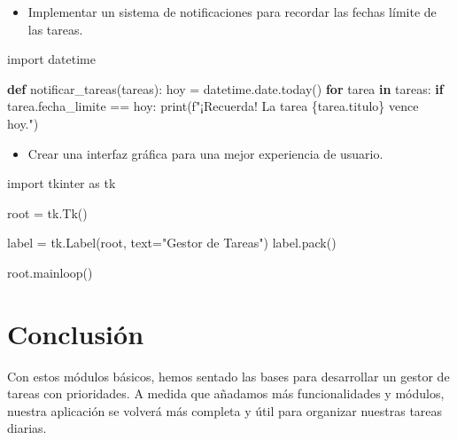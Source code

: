 \documentclass[
  a4paper,
  DIV=11,
  numbers=noendperiod,
  onepage,
  openany]{scrreprt}
\newenvironment{Shaded}{\begin{snugshade}}{\end{snugshade}}
\newcommand{\BuiltInTok}[1]{\textcolor[rgb]{0.00,0.23,0.31}{#1}}
\newcommand{\ControlFlowTok}[1]{\textcolor[rgb]{0.00,0.23,0.31}{\textbf{#1}}}
\newcommand{\ImportTok}[1]{\textcolor[rgb]{0.00,0.46,0.62}{#1}}
\newcommand{\KeywordTok}[1]{\textcolor[rgb]{0.00,0.23,0.31}{\textbf{#1}}}
\newcommand{\NormalTok}[1]{\textcolor[rgb]{0.00,0.23,0.31}{#1}}
\newcommand{\OperatorTok}[1]{\textcolor[rgb]{0.37,0.37,0.37}{#1}}
\newcommand{\SpecialCharTok}[1]{\textcolor[rgb]{0.37,0.37,0.37}{#1}}
\newcommand{\SpecialStringTok}[1]{\textcolor[rgb]{0.13,0.47,0.30}{#1}}
\newcommand{\StringTok}[1]{\textcolor[rgb]{0.13,0.47,0.30}{#1}}
\providecommand{\tightlist}{%
  \setlength{\itemsep}{0pt}\setlength{\parskip}{0pt}}\usepackage{longtable,booktabs,array}
\begin{document}
\begin{itemize}
\tightlist
\item
  Implementar un sistema de notificaciones para recordar las fechas
  límite de las tareas.
\end{itemize}

\begin{Shaded}
\begin{Highlighting}[]
\ImportTok{import}\NormalTok{ datetime}

\KeywordTok{def}\NormalTok{ notificar\_tareas(tareas):}
\NormalTok{    hoy }\OperatorTok{=}\NormalTok{ datetime.date.today()}
    \ControlFlowTok{for}\NormalTok{ tarea }\KeywordTok{in}\NormalTok{ tareas:}
        \ControlFlowTok{if}\NormalTok{ tarea.fecha\_limite }\OperatorTok{==}\NormalTok{ hoy:}
            \BuiltInTok{print}\NormalTok{(}\SpecialStringTok{f"¡Recuerda! La tarea \textquotesingle{}}\SpecialCharTok{\{}\NormalTok{tarea}\SpecialCharTok{.}\NormalTok{titulo}\SpecialCharTok{\}}\SpecialStringTok{\textquotesingle{} vence hoy."}\NormalTok{)}
\end{Highlighting}
\end{Shaded}

\begin{itemize}
\tightlist
\item
  Crear una interfaz gráfica para una mejor experiencia de usuario.
\end{itemize}

\begin{Shaded}
\begin{Highlighting}[]
\ImportTok{import}\NormalTok{ tkinter }\ImportTok{as}\NormalTok{ tk}

\NormalTok{root }\OperatorTok{=}\NormalTok{ tk.Tk()}

\NormalTok{label }\OperatorTok{=}\NormalTok{ tk.Label(root, text}\OperatorTok{=}\StringTok{"Gestor de Tareas"}\NormalTok{)}
\NormalTok{label.pack()}

\NormalTok{root.mainloop()}
\end{Highlighting}
\end{Shaded}

\chapter{Conclusión}\label{conclusiuxf3n-5}

Con estos módulos básicos, hemos sentado las bases para desarrollar un
gestor de tareas con prioridades. A medida que añadamos más
funcionalidades y módulos, nuestra aplicación se volverá más completa y
útil para organizar nuestras tareas diarias.
\end{document}
